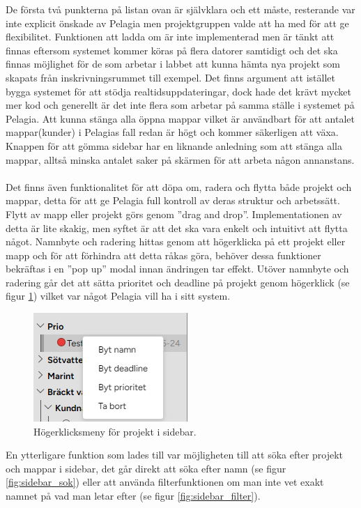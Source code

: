 \noindent De första två punkterna på listan ovan är självklara och ett måste, resterande var inte explicit önskade av Pelagia men projektgruppen valde att ha med för att ge flexibilitet.
Funktionen att ladda om är inte implementerad men är tänkt att finnas eftersom systemet kommer köras på flera datorer samtidigt och det ska finnas möjlighet för de som arbetar i labbet att kunna hämta nya projekt som skapats från inskrivningsrummet till exempel.
Det finns argument att istället bygga systemet för att stödja realtidsuppdateringar, dock hade det krävt mycket mer kod och generellt är det inte flera som arbetar på samma ställe i systemet på Pelagia.
Att kunna stänga alla öppna mappar vilket är användbart för att antalet mappar(kunder) i Pelagias fall redan är högt och kommer säkerligen att växa. Knappen för att gömma sidebar har en liknande anledning som att stänga alla mappar, alltså minska antalet saker på skärmen för att arbeta någon annanstans.
\\\\
Det finns även funktionalitet för att döpa om, radera och flytta både projekt och mappar, detta för att ge Pelagia full kontroll av deras struktur och arbetssätt. Flytt av mapp eller projekt görs genom ''drag and drop''. Implementationen av detta är
lite skakig, men syftet är att det ska vara enkelt och intuitivt att flytta något. Namnbyte och radering hittas genom att högerklicka på ett projekt eller mapp och för att förhindra att detta råkas göra, behöver dessa funktioner bekräftas i en ''pop up'' modal innan ändringen tar effekt.
Utöver namnbyte och radering går det att sätta prioritet och deadline på projekt genom högerklick (se figur \ref{fig:sidebar_menu}) vilket var något Pelagia vill ha i sitt system.
\begin{figure}[H]
    \centering
    \includegraphics[width=0.5\linewidth]{images/sidebar_menu.png}
    \caption{Högerklicksmeny för projekt i sidebar.}
    \label{fig:sidebar_menu}
\end{figure}
\noindent En ytterligare funktion som lades till var möjligheten till att söka efter projekt och mappar i sidebar, det går direkt att söka efter namn (se figur \ref{fig:sidebar_sok}) eller att använda filterfunktionen om man inte vet exakt namnet på vad man letar efter (se figur \ref{fig:sidebar_filter}).
